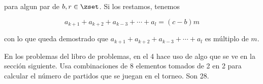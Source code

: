 \noindent para algun par de $b, r \in \zset$. Si los restamos, tenemos

$$ a_{k+1} + a_{k+2} + a_{k-3} + \cdots + a_l = (c - b)m $$

\noindent con lo que queda demostrado que $a_{k+1} + a_{k+2} + a_{k-3} +
\cdots + a_l$ es múltiplo de $m$.

En los problemas del libro de problemas, en el 4 hace uso de algo que se ve
en la sección siguiente. Usa combinaciones de 8 elementos tomados de 2 en 2
para calcular el número de partidos que se juegan en el torneo. Son 28.






